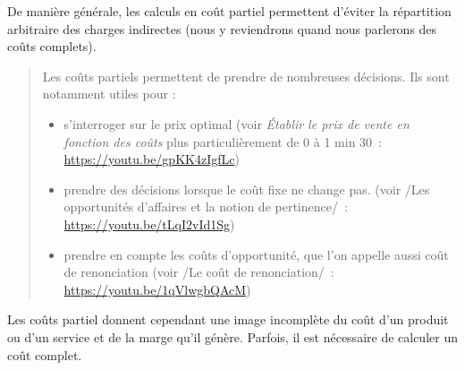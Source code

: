 \documentclass{kaobook}
\begin{document}
De manière générale, les calculs en coût partiel permettent d'éviter la répartition arbitraire des charges indirectes (nous y reviendrons quand nous parlerons des coûts complets).\\
\begin{quote}
Les coûts partiels permettent de prendre de nombreuses décisions. Ils sont notamment utiles pour :\\
\begin{itemize}
\item s'interroger sur le prix optimal (voir \emph{Établir le prix de vente en fonction des coûts} plus particulièrement de 0 à 1 min 30 : \url{https://youtu.be/gpKK4zIgfLc})\\
\item prendre des décisions lorsque le coût fixe ne change pas. (voir /Les opportunités d'affaires et la notion de pertinence/ : \url{https://youtu.be/tLqI2vId1Sg})\\
\item prendre en compte les coûts d'opportunité, que l'on appelle aussi coût de renonciation (voir /Le coût de renonciation/ : \url{https://youtu.be/1qVlwgbQAcM})\\
\end{itemize}
\end{quote}
Les coûts partiel donnent cependant une image incomplète du coût d'un produit ou d'un service et de la marge qu'il génère. Parfois, il est nécessaire de calculer un coût complet.\\
\end{document}

